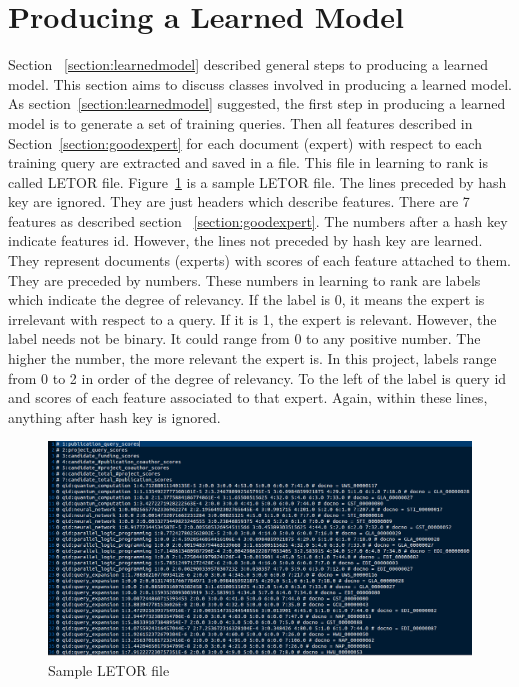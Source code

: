 \section{Producing a Learned Model}\label{section:producelearnedmodel}
Section ~\ref{section:learnedmodel} described general steps to producing a learned model. This section aims to discuss classes involved in producing a learned model.
As section~\ref{section:learnedmodel} suggested, the first step in producing a learned model is to generate a set of training queries. 
Then all features described in Section~\ref{section:goodexpert} for each document (expert) with respect to each training query are extracted and saved
in a file. This file in learning to rank is called LETOR file. Figure~\ref{fig:sampleletorfile} is a sample LETOR file. The lines preceded by hash key are 
ignored. They are just headers which describe features. There are 7 features as described section ~\ref{section:goodexpert}.
The numbers after a hash key indicate features id. However, the lines not preceded by hash key are learned. They represent documents (experts) with scores
of each feature attached to them. They are preceded by numbers. These numbers in learning to rank are labels which indicate the degree of relevancy.
If the label is 0, it means the expert is irrelevant with respect to a query. If it is 1, the expert is relevant. However, the label needs not be binary.
It could range from 0 to any positive number. The higher the number, the more relevant the expert is. In this project, labels range from 0 to 2 in order of 
the degree of relevancy. To the left of the label is query id and scores of each feature associated to that expert. Again, within these lines, anything after hash key is ignored.
\begin{figure}
\centering
\includegraphics[scale=0.3]{./figures/sampleletorfile.png}
\caption{Sample LETOR file} \label{fig:sampleletorfile} 
\end{figure}



